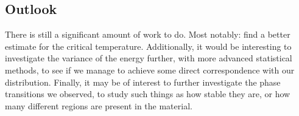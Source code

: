 \documentclass[a4paper, 10pt]{article}
\begin{document}
\subsection{Outlook}
There is still a significant amount of work to do. Most notably: find a better estimate for the critical temperature. Additionally, it would be interesting to investigate the variance of the energy further, with more advanced statistical methods, to see if we manage to achieve some direct correspondence with our distribution. Finally, it may be of interest to further investigate the phase transitions we observed, to study such things as how stable they are, or how many different regions are present in the material.


\newpage
\end{document}
